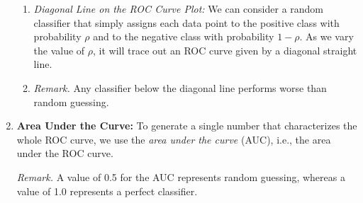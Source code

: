 \documentclass[12pt]{article}
\begin{document}
\begin{enumerate}[label=\textbf{\arabic*.}]
\begin{enumerate}
		\item \textit{Diagonal Line on the ROC Curve Plot:} We can consider a random classifier that simply assigns each data point to the positive class with probability $\rho$ and to the negative class with probability $1 - \rho$. As we vary the value of $\rho$, it will trace out an ROC curve given by a diagonal straight line. 
		
		\item[] \textit{Remark.} Any classifier below the diagonal line performs worse than random guessing. 
		
	\end{enumerate}
	
	\item \textbf{Area Under the Curve:} To generate a single number that characterizes the whole ROC curve, we use the \emph{area under the curve} (AUC), i.e., the area under the ROC curve. 
	
	\textit{Remark.} A value of 0.5 for the AUC represents random guessing, whereas a value of 1.0 represents a perfect classifier. 
	
\end{enumerate}

\printbibliography
\end{document}
